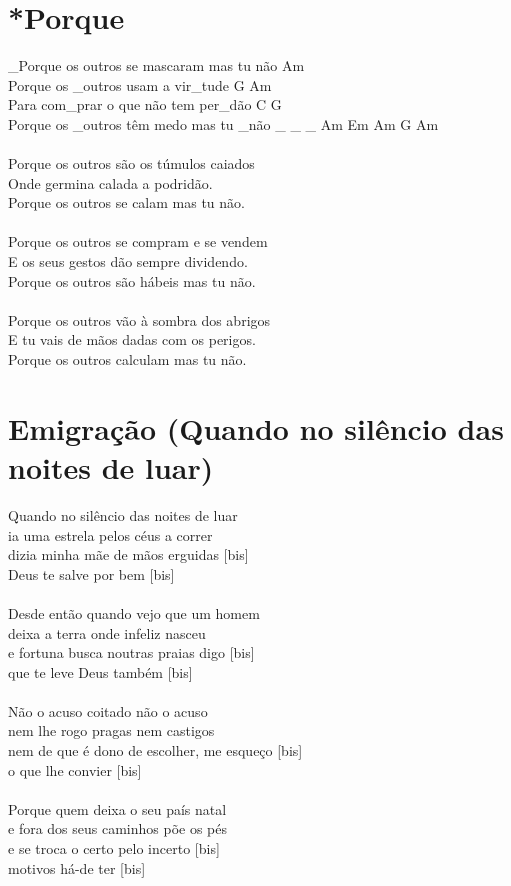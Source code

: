 \documentclass{article}
\begin{document}
\section{ *Porque}
_Porque os outros se mascaram mas tu não   Am\\
Porque os _outros usam a vir_tude          G Am\\
Para com_prar o que não tem per_dão        C G\\
Porque os _outros têm medo mas tu _não _ _ _    Am Em    Am G Am\\
\\
Porque os outros são os túmulos caiados\\
Onde germina calada a podridão.\\
Porque os outros se calam mas tu não.\\
\\
Porque os outros se compram e se vendem\\
E os seus gestos dão sempre dividendo.\\
Porque os outros são hábeis mas tu não.\\
\\
Porque os outros vão à sombra dos abrigos\\
E tu vais de mãos dadas com os perigos.\\
Porque os outros calculam mas tu não.\\
\section{ Emigração (Quando no silêncio das noites de luar)}
Quando no silêncio das noites de luar\\
ia uma estrela pelos céus a correr \\
dizia minha mãe de mãos erguidas [bis]\\
Deus te salve por bem [bis]\\
\\
Desde então quando vejo que um homem\\
deixa a terra onde infeliz nasceu\\
e fortuna busca noutras praias digo [bis]\\
que te leve Deus também [bis]\\
\\
Não o acuso coitado não o acuso\\
nem lhe rogo pragas nem castigos\\
nem de que é dono de escolher, me esqueço [bis]\\
o que lhe convier [bis]\\
\\
Porque quem deixa o seu país natal\\
e fora dos seus caminhos põe os pés\\
e se troca o certo pelo incerto [bis]\\
motivos há-de ter [bis]\\
\\
\end{document}
